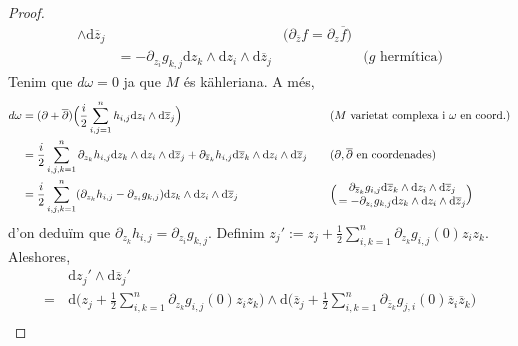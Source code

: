 \begin{lema}
\begin{proof}
\begin{align*}
            \wedge\textrm{d}\overline{z}_{j}
            &\quad&\textrm{($\partial_{\overline{z}}f=\partial_{z}\overline{f}$)}\\
            &=-\partial_{z_{i}}g_{k,j}
            \textrm{d}z_{k}
            \wedge\textrm{d}z_{i}
            \wedge\textrm{d}\overline{z}_{j}
            &\quad&\textrm{($g$ hermítica)}
        \end{align*}
        Tenim que $d\omega=0$ ja que $M$ és kähleriana. A més,
        \begin{align*}
            d\omega
            &=(\partial+\overline{\partial})
            \Big(\frac{i}{2}\sum_{i,j=1}^{n}h_{i,j}\textrm{d}z_{i}\wedge\textrm{d}\overline{z}_{j}\Big)
            &\quad&\textrm{($M$ varietat complexa i $\omega$ en coord.)}\\
            &=\frac{i}{2}
            \sum_{i,j,k=1}^{n}\partial_{z_{k}}h_{i,j}\textrm{d}z_{k}\wedge\textrm{d}z_{i}\wedge\textrm{d}\overline{z}_{j}+
            \partial_{\overline{z}_{k}}h_{i,j}\textrm{d}\overline{z}_{k}\wedge\textrm{d}z_{i}\wedge\textrm{d}\overline{z}_{j}
            &\quad&\textrm{($\partial,\overline{\partial}$ en coordenades)}\\
            &=\frac{i}{2}
            \sum_{i,j,k=1}^{n}(\partial_{z_{k}}h_{i,j}-\partial_{z_{i}}g_{k,j})
            \textrm{d}z_{k}
            \wedge\textrm{d}z_{i}
            \wedge\textrm{d}\overline{z}_{j}
            &\quad&\textrm{\Big(\,$\begin{matrix}
                \partial_{\overline{z}_{k}}g_{i,j}
            \textrm{d}\overline{z}_{k}
            \wedge\textrm{d}z_{i}
            \wedge\textrm{d}\overline{z}_{j}\\
            =-\partial_{z_{i}}g_{k,j}
            \textrm{d}z_{k}
            \wedge\textrm{d}z_{i}
            \wedge\textrm{d}\overline{z}_{j}
            \end{matrix}$\Big)}
        \end{align*}
        d'on deduïm que $\partial_{z_{k}}h_{i,j}=\partial_{z_{i}}g_{k,j}$. Definim $z_{j}':=z_{j}+\frac{1}{2}\sum_{i,k=1}^{n}\partial_{z_{k}}g_{i,j}(0)z_{i}z_{k}$. Aleshores,
        \begin{align*}
            &\textrm{d}z_{j}'
            \wedge\textrm{d}\overline{z}_{j}'\\
            =\,
            &\textrm{d}\Big(z_{j}+\frac{1}{2}\sum_{i,k=1}^{n}\partial_{z_{k}}g_{i,j}(0)z_{i}z_{k}\Big)
            \wedge\textrm{d}\Big(\overline{z}_{j}+\frac{1}{2}\sum_{i,k=1}^{n}\partial_{\overline{z}_{k}}g_{j,i}(0)\overline{z}_{i}\overline{z}_{k}\Big)\\

\end{align*}
\end{proof}
\end{lema}
